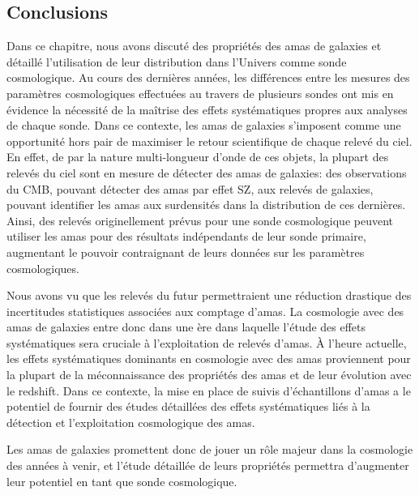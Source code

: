 \subsection{Conclusions}

Dans ce chapitre, nous avons discuté des propriétés des amas de galaxies et détaillé l'utilisation de leur distribution dans l'Univers comme sonde cosmologique.
Au cours des dernières années, les différences entre les mesures des paramètres cosmologiques effectuées au travers de plusieurs sondes ont mis en évidence la nécessité de la maîtrise des effets systématiques propres aux analyses de chaque sonde.
Dans ce contexte, les amas de galaxies s'imposent comme une opportunité hors pair de maximiser le retour scientifique de chaque relevé du ciel.
En effet, de par la nature multi-longueur d'onde de ces objets, la plupart des relevés du ciel sont en mesure de détecter des amas de galaxies: des observations du CMB, pouvant détecter des amas par effet SZ, aux relevés de galaxies, pouvant identifier les amas aux surdensités dans la distribution de ces dernières.
Ainsi, des relevés originellement prévus pour une sonde cosmologique peuvent utiliser les amas pour des résultats indépendants de leur sonde primaire, augmentant le pouvoir contraignant de leurs données sur les paramètres cosmologiques.

Nous avons vu que les relevés du futur permettraient une réduction drastique des incertitudes statistiques associées aux comptage d'amas.
La cosmologie avec des amas de galaxies entre donc dans une ère dans laquelle l'étude des effets systématiques sera cruciale à l'exploitation de relevés d'amas.
À l'heure actuelle, les effets systématiques dominants en cosmologie avec des amas proviennent pour la plupart de la méconnaissance des propriétés des amas et de leur évolution avec le redshift.
Dans ce contexte, la mise en place de suivis d'échantillons d'amas a le potentiel de fournir des études détaillées des effets systématiques liés à la détection et l'exploitation cosmologique des amas.

Les amas de galaxies promettent donc de jouer un rôle majeur dans la cosmologie des années à venir, et l'étude détaillée de leurs propriétés permettra d'augmenter leur potentiel en tant que sonde cosmologique.
